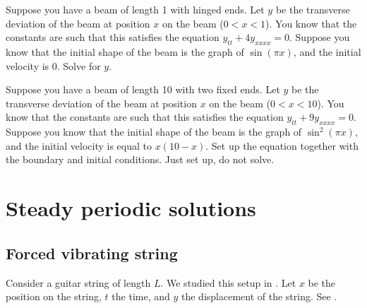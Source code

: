 \setcounter{exercise}{100}

\begin{exercise}
Suppose you have a beam of length 1 with hinged ends.  Let $y$ be the
transverse deviation of the beam at position $x$ on the beam ($0 < x < 1$).
You know that the
constants are such that this satisfies the equation $y_{tt} + 4 y_{xxxx} =
0$.   Suppose you know that the initial shape of the beam is the graph of
$\sin (\pi x)$, and the initial velocity is 0.  Solve for $y$.
\end{exercise}

\begin{exercise}
Suppose you have a beam of length 10 with two fixed ends.  Let $y$ be the
transverse deviation of the beam at position $x$ on the beam ($0 < x < 10$).
You know that the
constants are such that this satisfies the equation $y_{tt} + 9 y_{xxxx} =
0$.   Suppose you know that the initial shape of the beam is the graph of
$\sin^2(\pi x)$, and the initial velocity is equal to $x(10-x)$.
Set up the equation together with the
boundary and initial conditions.  Just set up, do not solve.
\end{exercise}


\sectionnewpage
\section{Steady periodic solutions}
\label{sps:section}



\subsection{Forced vibrating string}

Consider a guitar string of length $L$.  We studied this 
setup in .
Let $x$ be the position on the string, $t$ the time, and $y$ the displacement of the string.  See
.

\begin{myfig}
\capstart
{}
\caption{Vibrating string.\label{sps:vibstrfig}}
\end{myfig}

